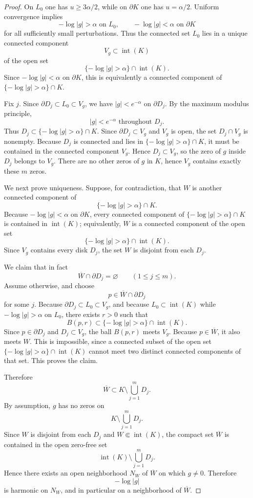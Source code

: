 \documentclass[12pt]{amsart}
\theoremstyle{definition}
\theoremstyle{remark}
\begin{document}
\begin{proof} On $L_0$ one has $u\ge 3\alpha/2$, while on $\partial K$ one has $u=\alpha/2$. Uniform convergence implies
\[
 -\log|g|>\alpha \text{ on }L_0,\qquad -\log|g|<\alpha \text{ on }\partial K
\]
for all sufficiently small perturbations. Thus the connected set $L_0$ lies in a unique connected component
\[
 V_g\subset \operatorname{int}(K)
\]
of the open set
\[
\{-\log|g|>\alpha\}\cap \operatorname{int}(K).
\]
Since $-\log|g|<\alpha$ on $\partial K$, this is equivalently a connected component of
$\{-\log|g|>\alpha\}\cap K$.

\indent Fix $j$. Since $\partial D_j\subset L_0\subset V_g$, we have $|g|<e^{-\alpha}$ on $\partial D_j$. By the maximum modulus principle,
\[
 |g|<e^{-\alpha} \text{ throughout } D_j.
\]
Thus $D_j\subset \{-\log|g|>\alpha\}\cap K$. Since $\partial D_j\subset V_g$ and $V_g$ is open, the set $D_j\cap V_g$ is nonempty. Because $D_j$ is connected and lies in $\{-\log|g|>\alpha\}\cap K$, it must be contained in the connected component $V_g$. Hence $D_j\subset V_g$, so the zero of $g$ inside $D_j$ belongs to $V_g$. There are no other zeros of $g$ in $K$, hence
$V_g$ contains exactly these $m$ zeros.

\indent We next prove uniqueness. Suppose, for contradiction, that $W$ is another connected
component of
\[
\{-\log|g|>\alpha\}\cap K.
\]
Because $-\log|g|<\alpha$ on $\partial K$, every connected component of
$\{-\log|g|>\alpha\}\cap K$ is contained in $\operatorname{int}(K)$; equivalently, $W$ is a
connected component of the open set
\[
\{-\log|g|>\alpha\}\cap \operatorname{int}(K).
\]
Since $V_g$ contains every disk $D_j$, the set $W$ is disjoint from each $D_j$.

We claim that in fact
\[
\overline{W}\cap \partial D_j=\varnothing
\qquad
(1\le j\le m).
\]
Assume otherwise, and choose
\[
p\in \overline{W}\cap \partial D_j
\]
for some $j$. Because $\partial D_j\subset L_0\subset V_g$, and because
$L_0\subset \operatorname{int}(K)$ while $-\log|g|>\alpha$ on $L_0$, there exists $r>0$
such that
\[
B(p,r)\subset \{-\log|g|>\alpha\}\cap \operatorname{int}(K).
\]
Since $p\in \partial D_j$ and $D_j\subset V_g$, the ball $B(p,r)$ meets $V_g$.
Because $p\in \overline{W}$, it also meets $W$. This is impossible, since a connected
subset of the open set $\{-\log|g|>\alpha\}\cap \operatorname{int}(K)$ cannot meet two distinct connected
components of that set. This proves the claim.

Therefore
\[
\overline{W}\subset K\setminus \bigcup_{j=1}^m D_j.
\]
By assumption, $g$ has no zeros on
\[
K \setminus \bigcup_{j=1}^m D_j.
\]
Since $W$ is disjoint from each $D_j$ and $W \Subset \operatorname{int}(K)$, the compact
set $\overline W$ is contained in the open zero-free set
\[
\operatorname{int}(K)\setminus \bigcup_{j=1}^m D_j.
\]
Hence there exists an open neighborhood $N_W$ of $\overline W$ on which $g\neq 0$.
Therefore
\[
-\log|g|
\]
is harmonic on $N_W$, and in particular on a neighborhood of $\overline W$.


\end{proof}
\end{document}
